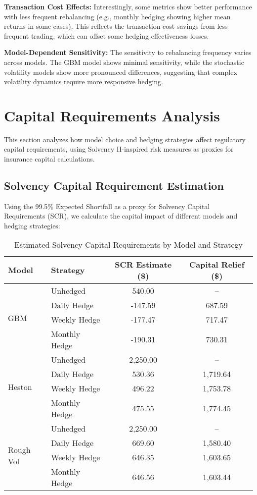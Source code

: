\documentclass[12pt,a4paper]{report}
\begin{document}
\textbf{Transaction Cost Effects:}
Interestingly, some metrics show better performance with less frequent rebalancing (e.g., monthly hedging showing higher mean returns in some cases). This reflects the transaction cost savings from less frequent trading, which can offset some hedging effectiveness losses.

\textbf{Model-Dependent Sensitivity:}
The sensitivity to rebalancing frequency varies across models. The GBM model shows minimal sensitivity, while the stochastic volatility models show more pronounced differences, suggesting that complex volatility dynamics require more responsive hedging.

\section{Capital Requirements Analysis}

This section analyzes how model choice and hedging strategies affect regulatory capital requirements, using Solvency II-inspired risk measures as proxies for insurance capital calculations.

\subsection{Solvency Capital Requirement Estimation}

Using the 99.5\% Expected Shortfall as a proxy for Solvency Capital Requirements (SCR), we calculate the capital impact of different models and hedging strategies:

\begin{table}[H]
\centering
\caption{Estimated Solvency Capital Requirements by Model and Strategy}
\label{tab:scr_analysis}
\begin{tabular}{llcc}
\toprule
\textbf{Model} & \textbf{Strategy} & \textbf{SCR Estimate (\$)} & \textbf{Capital Relief (\$)} \\
\midrule
\multirow{4}{*}{GBM} & Unhedged & 540.00 & -- \\
& Daily Hedge & -147.59 & 687.59 \\
& Weekly Hedge & -177.47 & 717.47 \\
& Monthly Hedge & -190.31 & 730.31 \\
\midrule
\multirow{4}{*}{Heston} & Unhedged & 2,250.00 & -- \\
& Daily Hedge & 530.36 & 1,719.64 \\
& Weekly Hedge & 496.22 & 1,753.78 \\
& Monthly Hedge & 475.55 & 1,774.45 \\
\midrule
\multirow{4}{*}{Rough Vol} & Unhedged & 2,250.00 & -- \\
& Daily Hedge & 669.60 & 1,580.40 \\
& Weekly Hedge & 646.35 & 1,603.65 \\
& Monthly Hedge & 646.56 & 1,603.44 \\
\bottomrule
\end{tabular}
\end{table}
\end{document}
